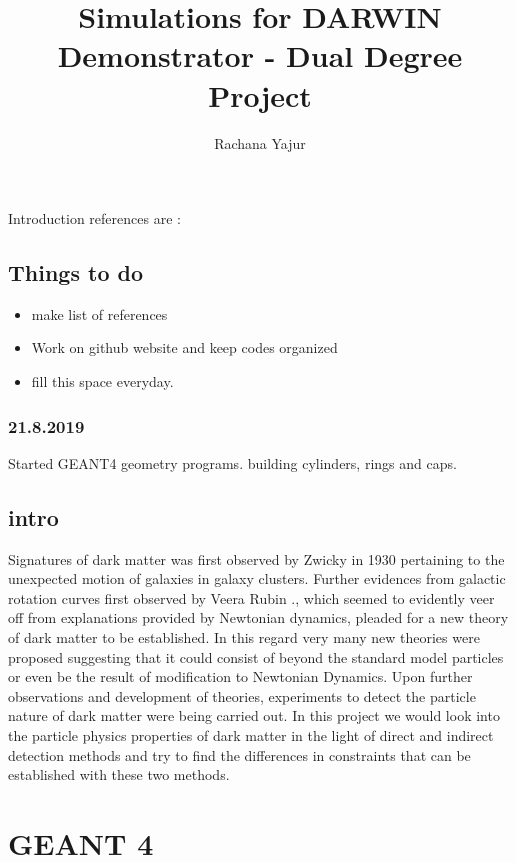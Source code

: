 \documentclass[10pt,a4paper]{book}
\author{Rachana Yajur}
\title{Simulations for DARWIN Demonstrator - Dual Degree Project}
\begin{document}
	\tableofcontents
	\begin{chapter}{Introduction}
		references are : 
		\section{Things to do}
		\begin{itemize}
			\item make list of references
			\item Work on github website and keep codes organized
            \item fill this space everyday. 
		\end{itemize}
	\subsection{21.8.2019}
		Started GEANT4 geometry programs. building cylinders, rings and caps. 
	
	
\section{intro}
	Signatures of dark matter was first observed by Zwicky\cite{Zwicky} in 1930 pertaining to the unexpected motion of galaxies in galaxy clusters. Further evidences from galactic rotation curves first observed by Veera Rubin \cite{VeeraRubin}.,  which seemed to evidently veer off from explanations provided by Newtonian dynamics, pleaded for a new theory of dark matter to be established. In this regard very many new theories were proposed suggesting that it could consist of beyond the standard model particles or even be the result of modification to Newtonian Dynamics\cite{MoND}. Upon further observations and development of theories, experiments to detect the particle nature of dark matter were being carried out. In this project we would look into the particle physics properties of dark matter in the light of direct and indirect detection methods and try to find the differences in constraints that can be established with these two methods. 
	
	\end{chapter}

\chapter{GEANT 4}
\end{document}
